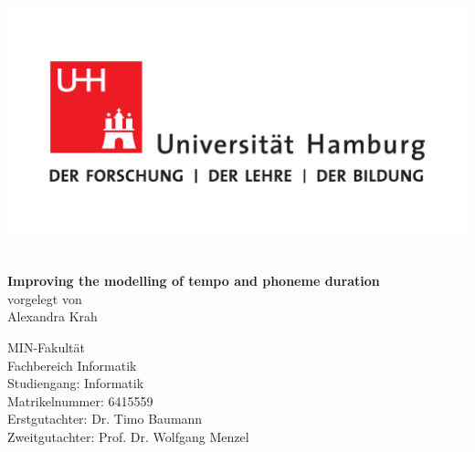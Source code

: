 \documentclass[11pt,a4paper]{scrbook}
\begin{document}
\frontmatter
{}

\begin{titlepage}
\includegraphics[scale=0.3]{../Graphen/UHH-Logo_2010_Farbe_CMYK.pdf}
\vspace*{2cm}
\Large

\begin{center} 
      {\color{uhhred}\textbf{}}
	\vspace*{2.0cm}\\
	{\LARGE \textbf{Improving the modelling of tempo and phoneme duration}}
	\vspace*{2.0cm}\\
	vorgelegt von
	\vspace*{0.4cm}\\
	Alexandra Krah
\end{center}

\vspace*{3.9cm}

\noindent 
MIN-Fakultät \vspace*{0.4cm} \\ 
Fachbereich Informatik \vspace*{0.4cm} \\ 
Studiengang: Informatik \vspace*{0.4cm} \\ 
Matrikelnummer: 6415559 \vspace*{0.8cm} \\ 
Erstgutachter: Dr. Timo Baumann \vspace*{0.4cm} \\ 
Zweitgutachter: Prof. Dr. Wolfgang Menzel

\end{titlepage}

\restoregeometry

\tableofcontents\thispagestyle{empty}
\end{document}
